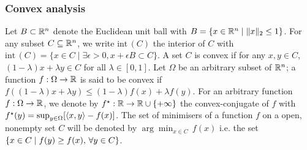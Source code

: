 \subsubsection{Convex analysis}
Let $B\subset\mathbb R^{n}$ denote the Euclidean unit ball with $B=\{x\in\mathbb R^{n}\mid \|x\|_{2}\le 1\}$. For any subset $C\subseteq\mathbb R^{n}$, we write $\mathrm{int}\,(C)$ the interior of $C$ with $\mathrm{int}\,(C)=\{x\in C \mid \exists \epsilon>0, x+\epsilon B \subset C\}$. A set $C$ is convex if for any $x,y\in C$, $(1-\lambda)x+\lambda y\in C$ for all $\lambda\in[0,1]$. Let $\Omega$ be an arbitrary subset of $\mathbb R^{n}$; a function $f:\Omega\to\mathbb R$ is said to be convex if $f((1-\lambda)x+\lambda y)\le (1-\lambda)f(x)+\lambda f(y)$. For an arbitrary function $f:\Omega\to\mathbb R$, we denote by $f^{\star}:\mathbb R\to \mathbb R\cup\{+\infty\}$ the convex-conjugate of $f$ with $f^{\star}(y)=\sup_{y\in \Omega}[\left\langle x,y \right\rangle-f(x)]$. The set of minimisers of a function $f$ on a open, nonempty set $C$ will be denoted by $\arg\min_{x\in C}\,f(x)$ i.e. the set $\left\{x\in C\mid f(y)\ge f(x), \,\forall y\in C\right\}$. 
